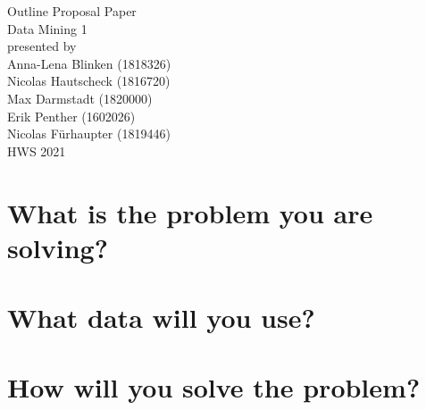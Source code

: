 \documentclass[11pt,titlepage,oneside,openany]{article}
\begin{document}
\begin{titlepage}
	\vspace*{2cm}
  \begin{center}
   {\Large Outline Proposal Paper\\}
   \vspace{2cm} 
   {Data Mining 1\\}
   \vspace{2cm}
   {presented by\\
    Anna-Lena Blinken (1818326)\\
	Nicolas Hautscheck (1816720)\\
	Max Darmstadt (1820000)\\
	Erik Penther (1602026)\\
	Nicolas Fürhaupter (1819446)\\
   }
   \vspace{1cm} 
   {HWS 2021}
  \end{center}
\end{titlepage} 

\tableofcontents
\newpage





\newpage



\section{What is the problem you are solving?}

\section{What data will you use?}

\section{How will you solve the problem?}
\end{document}
